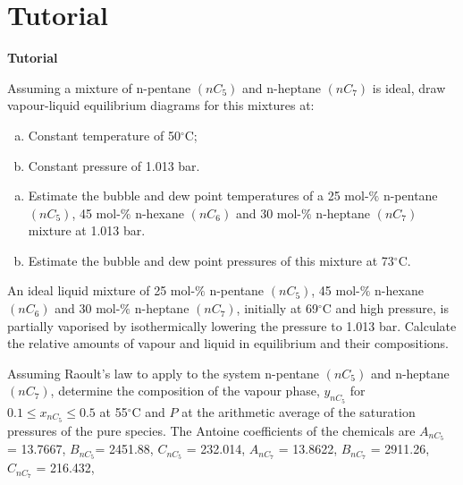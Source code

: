 \section{Tutorial}
\begin{MyTutorial}{\begin{center}{\bf Tutorial}\end{center}}
%
  \begin{problem}\label{Chapter:VLE:Tutorial:01} %
     Assuming a mixture of n-pentane $\left(nC_{5}\right)$ and n-heptane $\left(nC_{7}\right)$ is ideal, draw vapour-liquid equilibrium diagrams for this mixtures at:
    \begin{enumerate}[a)]
        \item Constant temperature of 50$^{\circ}$C;
        \item Constant pressure of 1.013 bar.
    \end{enumerate}
  \end{problem}
%
  \begin{problem}\label{Chapter:VLE:Tutorial:02} %
    \begin{enumerate}[a)]
        \item Estimate the bubble and dew point temperatures of a 25 mol-$\%$ n-pentane $\left(nC_{5}\right)$, 45 mol-$\%$ n-hexane $\left(nC_{6}\right)$ and 30 mol-$\%$ n-heptane $\left(nC_{7}\right)$ mixture at 1.013 bar. 
        \item  Estimate the bubble and dew point pressures of this mixture at 73$^{\circ}$C.
    \end{enumerate}
  \end{problem}
%
  \begin{problem}\label{Chapter:VLE:Tutorial:03} %
     An ideal liquid mixture of 25 mol-$\%$ n-pentane $\left(nC_{5}\right)$, 45 mol-$\%$ n-hexane $\left(nC_{6}\right)$ and 30 mol-$\%$ n-heptane $\left(nC_{7}\right)$, initially at 69$^{\circ}$C and high pressure, is partially vaporised by isothermically lowering the pressure to 1.013 bar. Calculate the relative amounts of vapour and liquid in equilibrium and their compositions.
  \end{problem}
%
  \begin{problem}\label{Chapter:VLE:Tutorial:04} %
     Assuming Raoult's law to apply to the system n-pentane $\left(nC_{5}\right)$ and n-heptane $\left(nC_{7}\right)$, determine the composition of the vapour phase, $y_{nC_{5}}$ for $0.1\leq x_{nC_{5}}\leq 0.5$ at 55$^{\circ}$C and $P$ at the arithmetic average of the saturation pressures of the pure species. The Antoine coefficients of the chemicals are $A_{nC_{5}}$ = 13.7667, $B_{nC_{5}}$= 2451.88, $C_{nC_{5}}$ = 232.014, $A_{nC_{7}}$ = 13.8622, $B_{nC_{7}}$ = 2911.26, $C_{nC_{7}}$ = 216.432,

\end{problem}
\end{MyTutorial}
